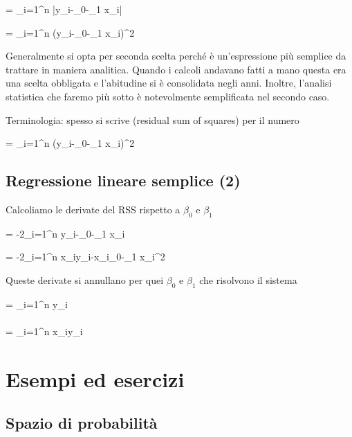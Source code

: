 \documentclass[11pt,openany]{book}
\def\emph#1{\textcolor{blue}{\textbf{\boldmath #1}}}
\renewcommand*{\emph}[1]{%
   \smash{\tikz[baseline]\node[rectangle, fill=teal!25, rounded corners, inner xsep=0.5ex, inner ysep=0.2ex, anchor=base, minimum height = 2.7ex]{#1};}}
\begin{document}
{=}
{\sum_{i=1}^n |y_i-\beta_0-\beta_1 x_i|}

{=}
{\sum_{i=1}^n (y_i-\beta_0-\beta_1 x_i)^2}

Generalmente si opta per seconda scelta perché è un'espressione più semplice da trattare in maniera analitica. Quando i calcoli andavano fatti a mano questa era una scelta obbligata e l'abitudine si è consolidata negli anni. Inoltre, l'analisi statistica che faremo più sotto è notevolmente semplificata nel secondo caso.


Terminologia: spesso si scrive \emph{RSS\/} (residual sum of squares) per il numero

{=}
{\sum_{i=1}^n (y_i-\beta_0-\beta_1 x_i)^2}
 
\hfill{}\clearpage\section{Regressione lineare semplice (2)}
\label{regressione_lineare2}

Calcoliamo le derivate del RSS rispetto a $\beta_0$ e $\beta_1$

{=}
{-2\sum_{i=1}^n y_i-\beta_0-\beta_1 x_i}

{=}
{-2\sum_{i=1}^n x_iy_i-x_i\beta_0-\beta_1 x_i^2}


Queste derivate si annullano per quei $\beta_0$ e $\beta_1$ che risolvono il sistema

{=}
{\sum_{i=1}^n y_i}
\\
\\
{=}
{\sum_{i=1}^n x_iy_i}




\chapter{Esempi ed esercizi}
\label{ch2}


\hfill{}\clearpage\section{Spazio di probabilità}
\end{document}

